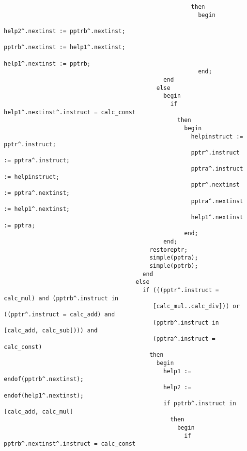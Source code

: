 \begin{refsection}
\begin{lstlisting}
                                                      then
                                                        begin
                                                          help2^.nextinst := pptrb^.nextinst;
                                                          pptrb^.nextinst := help1^.nextinst;
                                                          help1^.nextinst := pptrb;
                                                        end;
                                              end
                                            else
                                              begin
                                                if help1^.nextinst^.instruct = calc_const
                                                  then
                                                    begin
                                                      helpinstruct := pptr^.instruct;
                                                      pptr^.instruct := pptra^.instruct;
                                                      pptra^.instruct := helpinstruct;
                                                      pptr^.nextinst := pptra^.nextinst;
                                                      pptra^.nextinst := help1^.nextinst;
                                                      help1^.nextinst := pptra;
                                                    end;
                                              end;
                                          restoreptr;
                                          simple(pptra);
                                          simple(pptrb);
                                        end
                                      else
                                        if (((pptr^.instruct = calc_mul) and (pptrb^.instruct in
                                           [calc_mul..calc_div])) or ((pptr^.instruct = calc_add) and
                                           (pptrb^.instruct in [calc_add, calc_sub]))) and
                                           (pptra^.instruct = calc_const)
                                          then
                                            begin
                                              help1 := endof(pptrb^.nextinst);
                                              help2 := endof(help1^.nextinst);
                                              if pptrb^.instruct in [calc_add, calc_mul]
                                                then
                                                  begin
                                                    if pptrb^.nextinst^.instruct = calc_const

\end{lstlisting}
\end{refsection}
